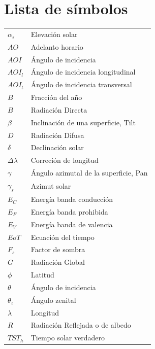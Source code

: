 \chapter{Lista de símbolos}
\begin{tabular}{ll}
    $\alpha_s$ & Elevación solar \\
   	$AO$ & Adelanto horario \\
    $AOI$ & Ángulo de incidencia \\
    $AOI_l$ & Ángulo de incidencia longitudinal \\
    $AOI_t$ & Ángulo de incidencia transversal \\
    $B$ & Fracción del año \\
    $B$ & Radiación Directa \\
    $\beta$ & Inclinación de una superficie, Tilt \\
    $D$ & Radiación Difusa \\ 
    $\delta$ & Declinación solar \\
    $\Delta \lambda$ & Correción de longitud \\
    $\gamma$ & Ángulo azimutal de la superficie, Pan \\
    $\gamma_s$ & Azimut solar \\
    $E_C$ & Energía banda conducción \\
    $E_F$ & Energía banda prohibida \\
    $E_V$ & Energía banda de valencia \\
    $EoT$ & Ecuación del tiempo \\
    $F_s$ & Factor de sombra \\
    $G$ & Radiación Global \\
    $\phi$ & Latitud \\   
    $\theta$ & Ángulo de incidencia \\
    $\theta_z$ & Ángulo zenital \\
    $\lambda$ & Longitud \\
    $R$ & Radiación Reflejada o de albedo \\
   	$TST_h$ & Tiempo solar verdadero \\
\end{tabular}

    


